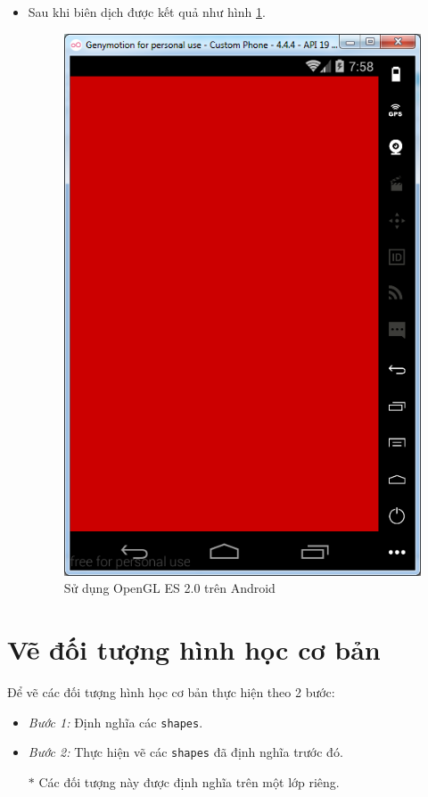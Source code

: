 \documentclass[13pt,a4paper]{extreport}
\begin{document}
\begin{itemize}
		\item Sau khi biên dịch được kết quả như hình \ref{Fig:opengles-1}.
			\begin{figure}[!h]
				\begin{center}
					\includegraphics[scale=.6]{images/opengles-1.png}
				\end{center}
				\caption{Sử dụng OpenGL ES 2.0 trên Android} \label{Fig:opengles-1}
			\end{figure}			
	\end{itemize}

\newpage	
\section{Vẽ đối tượng hình học cơ bản}
	Để vẽ các đối tượng hình học cơ bản thực hiện theo 2 bước:
		\begin{itemize}
			\item \emph{Bước 1:} Định nghĩa các \verb|shapes|.
			
			\item \emph{Bước 2:} Thực hiện vẽ các \verb|shapes| đã định nghĩa trước đó.
			
			\item[$\ast$] Các đối tượng này được định nghĩa trên một lớp riêng.
		\end{itemize}
\end{document}
